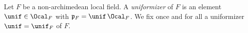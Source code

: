Let $F$ be a non-archimedean local field. A \emph{uniformizer} of $F$ is an element $\unif\in\Ocal_F$ with
$\mathfrak{p}_F=\unif\,\Ocal_F$. We fix once and for all a uniformizer $\unif=\unif_F$ of $F$.
